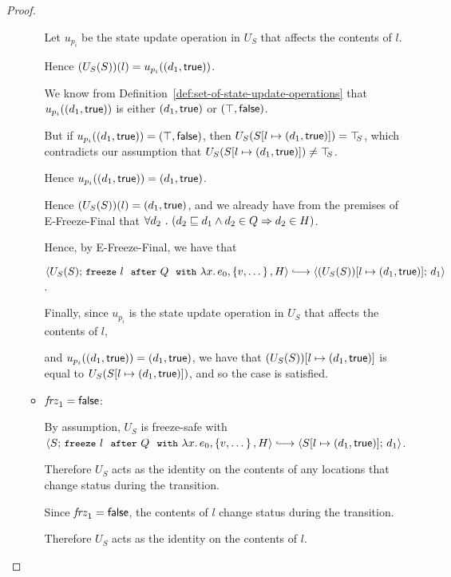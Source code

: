 \begin{proof}
\begin{itemize}
\begin{itemize}
      Let $u_{p_i}$ be the state update operation in $U_S$ that
      affects the contents of $l$.

      Hence $(U_S(S))(l) = u_{p_i}((d_1, \textsf{true}))$.

      We know from Definition~\ref{def:set-of-state-update-operations}
      that $u_{p_i}((d_1, \textsf{true}))$ is either
      $(d_1, \textsf{true})$ or $(\top, \textsf{false})$.

      But if $u_{p_i}((d_1, \textsf{true})) =
      (\top, \textsf{false})$, then
      $U_S(S[l \mapsto (d_1, \textsf{true})]) = \top\hspace{-0.85mm}_{S}$, which contradicts
      our assumption that $U_S(S[l \mapsto (d_1, \textsf{true})]) \neq
      \top\hspace{-0.85mm}_{S}$.

      Hence $u_{p_i}((d_1, \textsf{true})) =
      (d_1, \textsf{true})$.

      Hence $(U_S(S))(l) = (d_1, \textsf{true})$, and we already
      have from the premises of {\sc E-Freeze-Final} that
      $\forall{d_2} ~.~ ( {d_2 \sqsubseteq d_1 \land d_2 \in Q}
      \Rightarrow d_2 \in H)$.

      Hence, by {\sc E-Freeze-Final}, we have that

      $\config{U_S(S)}{\freezeafterfull{l}{Q}{\lam{x}{e_0}}{\setof{v,
            \dots}}{H}} \parstepsto
      \config{\extS{(U_S(S))}{l}{d_1}{\frozentrue}}{d_1}$.

      Finally, since $u_{p_i}$ is the state update operation in $U_S$
      that affects the contents of $l$,

      and $u_{p_i}((d_1, \textsf{true})) =
      (d_1, \textsf{true})$, we have that
      $(U_S(S))[l \mapsto (d_1, \textsf{true})]$ is equal to
      $U_S(S[l \mapsto (d_1, \textsf{true})])$, and so the case is
      satisfied.

    \item $\mathit{frz}_1 = \textsf{false}$:

      By assumption, $U_S$ is freeze-safe with
      $\config{S}{\freezeafterfull{l}{Q}{\lam{x}{e_0}}{\setof{v,
            \dots}}{H}} \parstepsto
      \config{\extS{S}{l}{d_1}{\frozentrue}}{d_1}$.

      Therefore $U_S$ acts as the identity on the contents of any
      locations that change status during the transition.

      Since $\mathit{frz}_1 = \textsf{false}$, the contents of $l$ change
      status during the transition.

      Therefore $U_S$ acts as the identity on the contents of $l$.


\end{itemize}
\end{itemize}
\end{proof}
